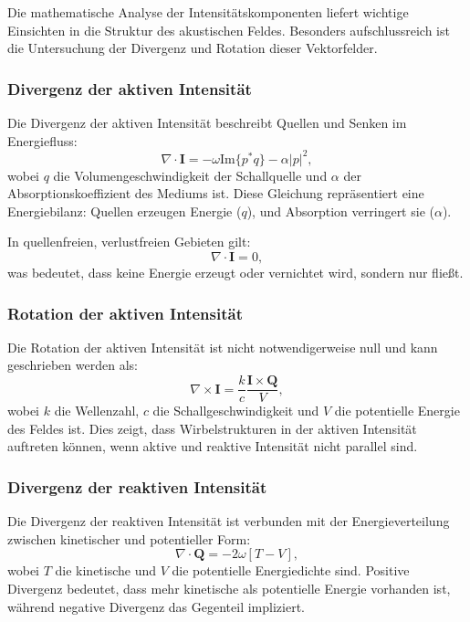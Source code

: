 Die mathematische Analyse der Intensitätskomponenten liefert wichtige
Einsichten in die Struktur des akustischen Feldes.
Besonders aufschlussreich ist die Untersuchung der Divergenz und
Rotation dieser Vektorfelder.

\subsubsection{Divergenz der aktiven Intensität}

Die Divergenz der aktiven Intensität beschreibt Quellen und Senken im Energiefluss:
\begin{equation}
\nabla \cdot \boldsymbol{I} = -\omega\text{Im}\{p^*q\} - \alpha|p|^2,
\end{equation}
wobei $q$ die Volumengeschwindigkeit der Schallquelle und $\alpha$ der Absorptionskoeffizient des Mediums ist.
Diese Gleichung repräsentiert eine Energiebilanz: Quellen erzeugen Energie ($q$), und Absorption verringert sie ($\alpha$).

In quellenfreien, verlustfreien Gebieten gilt:
\begin{equation}
\nabla \cdot \boldsymbol{I} = 0,
\end{equation}
was bedeutet, dass keine Energie erzeugt oder vernichtet wird, sondern nur fließt.

\subsubsection{Rotation der aktiven Intensität}

Die Rotation der aktiven Intensität ist nicht notwendigerweise null und kann geschrieben werden als:
\begin{equation}
\nabla \times \boldsymbol{I} = \frac{k}{c} \frac{\boldsymbol{I} \times \boldsymbol{Q}}{V},
\end{equation}
wobei $k$ die Wellenzahl, $c$ die Schallgeschwindigkeit und $V$ die potentielle Energie des Feldes ist.
Dies zeigt, dass Wirbelstrukturen in der aktiven Intensität auftreten können, wenn aktive und reaktive Intensität nicht parallel sind.

\subsubsection{Divergenz der reaktiven Intensität}

Die Divergenz der reaktiven Intensität ist verbunden mit der Energieverteilung zwischen kinetischer und potentieller Form:
\begin{equation}
\nabla \cdot \boldsymbol{Q} = -2 \omega [T-V],
\end{equation}
wobei $T$ die kinetische und $V$ die potentielle Energiedichte sind.
Positive Divergenz bedeutet, dass mehr kinetische als potentielle Energie vorhanden ist, während negative Divergenz das Gegenteil impliziert.

